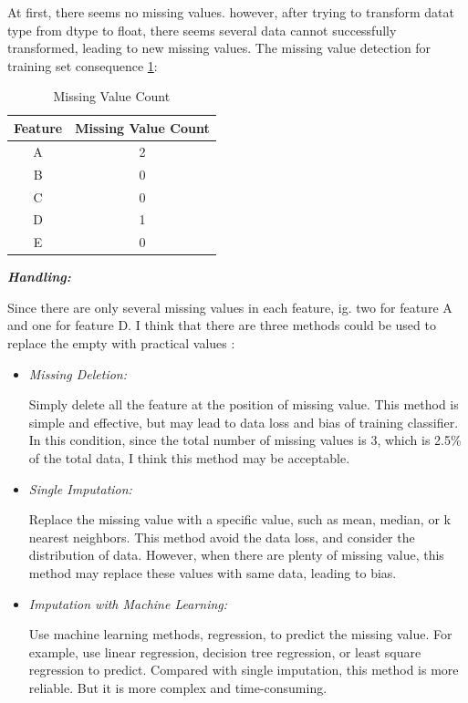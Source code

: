 \documentclass[a4paper,12pt]{article}
\begin{document}
At first, there seems no missing values. however, after trying to transform datat type from dtype to float, there seems several data cannot successfully transformed, leading to new missing values. The missing value detection for training set consequence \ref{tab:missing_value_count}:
\begin{table}[H]
    \centering
    \begin{tabular}{|c|c|}
        \hline
        Feature&Missing Value Count\\
        \hline
        A&2\\
        \hline
        B&0\\
        \hline
        C&0\\
        \hline
        D&1\\
        \hline
        E&0\\
        \hline
    \end{tabular}
    \caption{Missing Value Count}
    \label{tab:missing_value_count}
\end{table}
\textbf{\textit{Handling:}}
  
Since there are only several missing values in each feature, ig. two for feature A and one for feature D. I think that there are three methods could be used to replace the empty with practical values \cite{ren_review_2023}:
\begin{itemize}
    \item \textit{Missing Deletion:} 
    
    Simply delete all the feature at the position of missing value. This method is simple and effective, but may lead to data loss and bias of training classifier. In this condition, since the total number of missing values is 3, which is 2.5\% of the total data,
    I think this method may be acceptable.
    \item \textit{Single Imputation:} 
    
    Replace the missing value with a specific value, such as mean, median, or k nearest neighbors. This method avoid the data loss, and consider the distribution of data. However, when there are plenty of missing value, this method may replace these values with same data, leading to bias.
    \item \textit{Imputation with Machine Learning:} 
    
    Use machine learning methods, regression, to predict the missing value. For example, use linear regression, decision tree regression, or least square regression to predict. Compared with single imputation, this method is more reliable. But it is more complex and time-consuming.
\end{itemize}
  
\end{document}
